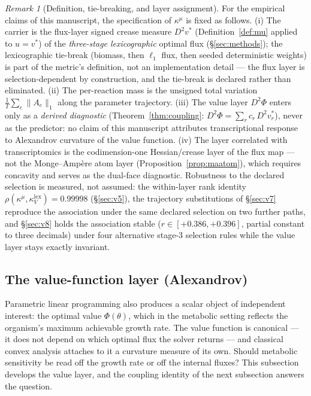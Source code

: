 \documentclass[11pt,a4paper]{article}
\theoremstyle{plain}
\theoremstyle{definition}
\theoremstyle{remark}
\newtheorem{remark}[theorem]{Remark}
\newcommand{\kk}{\kappa_{\!V}}
\newcommand{\kmu}{\kappa^{\mu}}
\begin{document}
\begin{remark}[Definition, tie-breaking, and layer assignment]
\label{rem:lock}
For the empirical claims of this manuscript, the specification of
$\kmu$ is fixed as follows. (i) The carrier is the flux-layer signed crease measure
$D^2 v^*$ (Definition~\ref{def:mu} applied to $u = v^*$) of the
\emph{three-stage lexicographic} optimal flux (\S\ref{sec:methods});
the lexicographic tie-break (biomass, then $\ell_1$ flux, then seeded
deterministic weights) is part of the metric's definition, not an
implementation detail --- the flux layer is selection-dependent by
construction, and the tie-break is declared rather than eliminated.
(ii) The per-reaction mass is the unsigned total variation
$\frac{1}{T}\sum_e \|A_e\|_1$ along the parameter trajectory.
(iii) The value layer $D^2\Phi$ enters only as a \emph{derived
diagnostic} (Theorem~\ref{thm:coupling}:
$D^2\Phi = \sum_r c_r\, D^2 v^*_r$), never as the predictor: no claim
of this manuscript attributes transcriptional response to Alexandrov
curvature of the value function. (iv) The layer correlated with
transcriptomics is the codimension-one Hessian/crease layer of the
flux map --- not the Monge--Amp\`ere atom layer
(Proposition~\ref{prop:maatom}), which requires concavity and serves
as the dual-face diagnostic. Robustness to the declared selection is
measured, not assumed: the within-layer rank identity
$\rho(\kmu, \kk^{\mathrm{lex}}) = 0.99998$ (\S\ref{sec:v5}), the trajectory substitutions of \S\ref{sec:v7} reproduce the association under the same declared selection on two further paths, and \S\ref{sec:v8} holds the
association stable ($r \in [+0.386, +0.396]$, partial constant to
three decimals) under four alternative stage-3 selection rules while
the value layer stays exactly invariant.
\end{remark}

\subsection{The value-function layer (Alexandrov)}

Parametric linear programming also produces a scalar object of
independent interest: the optimal value $\Phi(\theta)$, which in the
metabolic setting reflects the organism's maximum achievable growth
rate. The value function is canonical --- it does not depend on which
optimal flux the solver returns --- and classical convex analysis
attaches to it a curvature measure of its own. Should metabolic
sensitivity be read off the growth rate or off the internal fluxes?
This subsection develops the value layer, and the coupling identity
of the next subsection answers the question.
\end{document}
